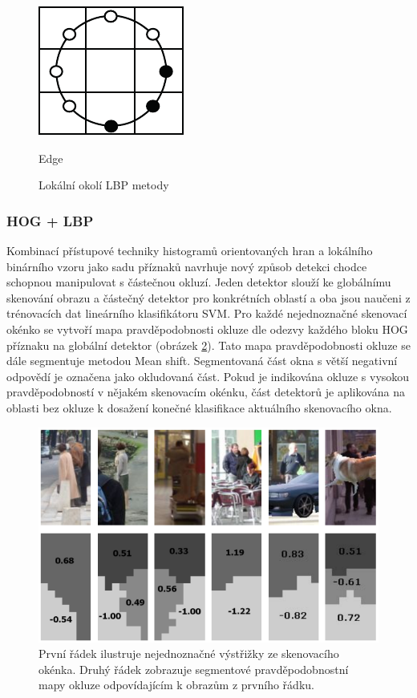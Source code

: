 \begin{figure}[H]
\begin{minipage}[b]{.18\textwidth}
  \includegraphics[width=.9\linewidth]{figures/lbp_edge}
  \caption*{Edge}
\end{minipage}
\caption{Lokální okolí LBP metody}
\label{fig:lbpvzory}
\end{figure}

\subsubsection*{HOG + LBP}
Kombinací přístupové techniky histogramů orientovaných hran a lokálního binárního vzoru jako sadu příznaků navrhuje nový způsob detekci chodce schopnou manipulovat s částečnou okluzí. Jeden detektor slouží ke globálnímu skenování obrazu a částečný detektor pro konkrétních oblastí a oba jsou naučeni z trénovacích dat lineárního klasifikátoru SVM. Pro každé nejednoznačné skenovací okénko se vytvoří mapa pravděpodobnosti okluze dle odezvy každého bloku HOG příznaku na globální detektor (obrázek \ref{fig:hoglbp}). Tato mapa pravděpodobnosti okluze se dále segmentuje metodou Mean shift. Segmentovaná část okna s větší negativní odpovědí je označena jako okludovaná část. Pokud je indikována okluze s vysokou pravděpodobností v nějakém skenovacím okénku, část detektorů je aplikována na oblasti bez okluze k dosažení konečné klasifikace aktuálního skenovacího okna. \cite{hoglpb}

\begin{figure}[H]
\centering
\includegraphics[width=.6\linewidth]{figures/hoglbp_obr}
\caption{ První řádek ilustruje nejednoznačné výstřižky ze skenovacího okénka. Druhý řádek zobrazuje segmentové pravděpodobnostní mapy okluze odpovídajícím k obrazům z prvního řádku.\cite{hoglpb}}
\label{fig:hoglbp}
\end{figure}

